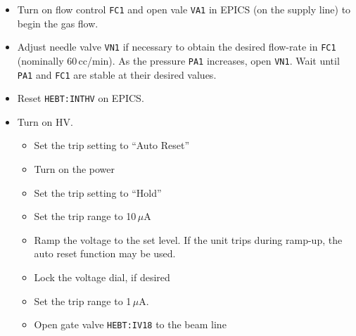 \begin{itemize}
\item Turn on flow control \texttt{FC1} and open vale \texttt{VA1} in EPICS (on the supply line) to begin the gas flow.
\item Adjust needle valve \texttt{VN1} if necessary to obtain the desired flow-rate in \texttt{FC1} (nominally 60\,cc/min).  As the pressure \texttt{PA1} increases, open \texttt{VN1}. Wait until \texttt{PA1} and \texttt{FC1} are stable at their desired values.
\item Reset \texttt{HEBT:INTHV} on EPICS.
\item Turn on HV.
\begin{itemize}
\setlength{\itemsep}{0pt}
\setlength{\parskip}{0pt}
\setlength{\parsep}{0pt}
\item Set the trip setting  to ``Auto Reset''
\item Turn on the power
\item Set the trip setting to ``Hold''
\item Set the trip range to 10\,$\mu$A
\item Ramp the voltage to the set level.  If the unit trips during ramp-up, the auto reset function may be used. 
\item Lock the voltage dial, if desired
\item Set the trip range to 1\,$\mu$A.\item Open gate valve \texttt{HEBT:IV18} to the beam line
\end{itemize}
\end{itemize}

